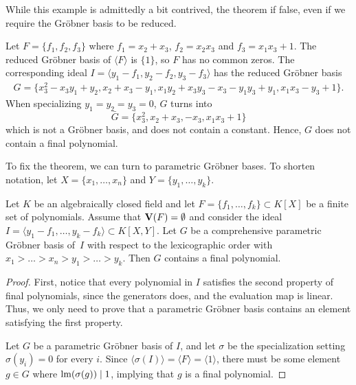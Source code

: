 While this example is admittedly a bit contrived, the theorem if false, even if we require the Gröbner basis to be reduced.

\begin{example}\upshape
    Let $F = \{f_1, f_2, f_3\}$ where $f_1 = x_2 + x_3$, $f_2 = x_2 x_3$ and $f_3 = x_1 x_3 + 1$. The reduced Gröbner basis of $\langle F \rangle$ is $\{1\}$, so $F$ has no common zeros. The corresponding ideal $I = \langle y_1 - f_1, y_2 - f_2, y_3 - f_3 \rangle$ has the reduced Gröbner basis
    \begin{gather*}
    G = \{ x_3^2 - x_3 y_1 + y_2, x_2 + x_3 - y_1, x_1 y_2 + x_3 y_3 - x_3 - y_1 y_3 + y_1, x_1 x_3 - y_3 + 1\}.
    \end{gather*}
    When specializing $y_1 = y_2 = y_3 = 0$, $G$ turns into
    \[\bar G = \{ x_3^2, x_2 + x_3, -x_3, x_1 x_3 + 1\}\]
    which is not a Gröbner basis, and does not contain a constant. Hence, $G$ does not contain a final polynomial.
\end{example}

To fix the theorem, we can turn to parametric Gröbner bases. To shorten notation, let $X = \{x_{1}, \dots, x_{n}\}$ and $Y = \{y_{1}, \dots, y_{k}\}$.

\begin{theorem}
  Let $K$ be an algebraically closed field and let $F = \{f_{1}, \dots, f_{k}\} \subset K[X]$ be a finite set of polynomials. Assume that $\operatorname{\mathbf V}(F) = \emptyset$ and consider the ideal $I = \langle y_{1} - f_{1}, \dots, y_{k} - f_{k} \rangle \subset K[X, Y]$. Let $G$ be a comprehensive parametric Gröbner basis of $\,I$ with respect to the lexicographic order with $x_{1} > \dots > x_{n} > y_{1} > \dots > y_{k}$. Then $G$ contains a final polynomial.
\end{theorem}
\begin{proof}
  First, notice that every polynomial in $I$ satisfies the second property of final polynomials, since the generators does, and the evaluation map is linear. Thus, we only need to prove that a parametric Gröbner basis contains an element satisfying the first property.

  Let $G$ be a parametric Gröbner basis of $I$, and let $\sigma$ be the specialization setting $\sigma(y_{i}) = 0$ for every $i$. Since $\langle \sigma(I) \rangle = \langle F \rangle = \langle 1 \rangle$, there must be some element $g \in G$ where $\operatorname{lm}(\sigma(g)) \mid 1$, implying that $g$ is a final polynomial.
\end{proof}

